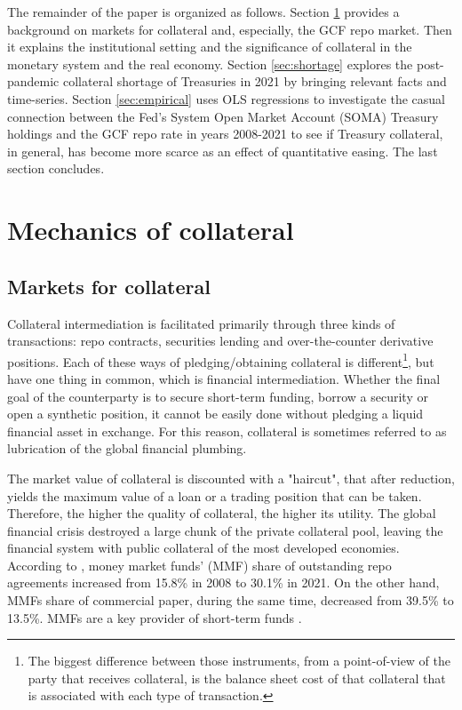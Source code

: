 \documentclass[11pt,a4paper,english,oneside]{article}
\begin{document}
The remainder of the paper is organized as follows. Section \ref{sec:mechanics} provides a background on markets for collateral and, especially, the GCF repo market. Then it explains the institutional setting and the significance of collateral in the monetary system and the real economy. Section \ref{sec:shortage} explores the post-pandemic collateral shortage of Treasuries in 2021 by bringing relevant facts and time-series. Section \ref{sec:empirical} uses OLS regressions to investigate the casual connection between the Fed's System Open Market Account (SOMA) Treasury holdings and the GCF repo rate in years 2008-2021 to see if Treasury collateral, in general, has become more scarce as an effect of quantitative easing. The last section concludes.

\clearpage 

\section{Mechanics of collateral} \label{sec:mechanics}

\subsection{Markets for collateral}

Collateral intermediation is facilitated primarily through three kinds of transactions: repo contracts, securities lending and over-the-counter derivative positions. Each of these ways of pledging/obtaining collateral is different\footnote{The biggest difference between those instruments, from a point-of-view of the party that receives collateral, is the balance sheet cost of that collateral that is associated with each type of transaction.}, but have one thing in common, which is financial intermediation. Whether the final goal of the counterparty is to secure short-term funding, borrow a security or open a synthetic position, it cannot be easily done without pledging a liquid financial asset in exchange. For this reason, collateral is sometimes referred to as lubrication of the global financial plumbing.

The market value of collateral is discounted with a "haircut", that after reduction, yields the maximum value of a loan or a trading position that can be taken. Therefore, the higher the quality of collateral, the higher its utility. The global financial crisis destroyed a large chunk of the private collateral pool, leaving the financial system with public collateral of the most developed economies. According to \citet{ofr2021b}, money market funds' (MMF) share of outstanding repo agreements increased from 15.8\% in 2008 to 30.1\% in 2021. On the other hand, MMFs share of commercial paper, during the same time, decreased from 39.5\% to 13.5\%. MMFs are a key provider of short-term funds \citep{ofr2021}.
\end{document}
